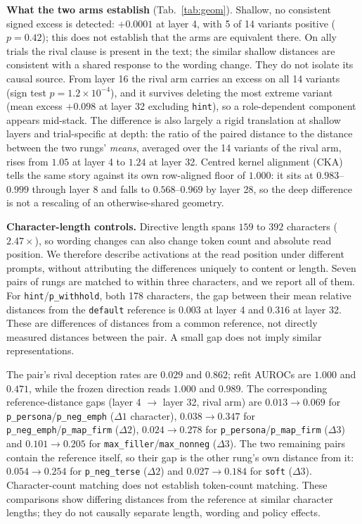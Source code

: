 \documentclass{article}
\begin{document}
\textbf{What the two arms establish} (Tab.~\ref{tab:geom}). Shallow, no consistent signed excess is detected: $+0.0001$ at layer 4, with 5 of 14 variants positive ($p = 0.42$); this does not establish that the arms are equivalent there. On ally trials the rival clause
is present in the text; the similar shallow distances are consistent with a shared response to the wording change. They do not isolate its causal source. From layer 16 the rival arm carries an excess on
all 14 variants (sign test $p = 1.2\times10^{-4}$), and it survives deleting the most extreme
variant (mean excess $+0.098$ at layer 32 excluding \texttt{hint}), so a role-dependent component appears
mid-stack. The difference is also largely a rigid translation at shallow layers and trial-specific at depth: the ratio of
the paired distance to the distance between the two rungs' \emph{means}, averaged over the 14 variants of the rival arm, rises from $1.05$ at layer 4 to
$1.24$ at layer 32. Centred kernel alignment (CKA) tells the same story against its own row-aligned floor of
$1.000$: it sits at $0.983$--$0.999$ through layer 8 and falls to $0.568$--$0.969$ by layer 28, so the deep
difference is not a rescaling of an otherwise-shared geometry.

\textbf{Character-length controls.} Directive length spans $159$ to $392$ characters ($2.47\times$), so wording changes can also change token count and absolute read position. We therefore describe activations at the read position under different prompts, without attributing the differences uniquely to content or length. Seven pairs of rungs are matched to within three characters, and we report all of them. For \texttt{hint}/\texttt{p\_withhold}, both 178 characters, the gap between their mean relative distances from the \texttt{default} reference is $0.003$ at layer 4 and $0.316$ at layer 32. These are differences of distances from a common reference, not directly measured distances between the pair. A small gap does not imply similar representations.

The pair's rival deception rates are $0.029$ and $\mathbf{0.862}$; refit AUROCs are $1.000$ and $\mathbf{0.471}$, while the frozen direction reads $1.000$ and $\mathbf{0.989}$. The corresponding reference-distance gaps (layer 4 $\to$ layer 32, rival arm) are $0.013 \to 0.069$ for \texttt{p\_persona}/\texttt{p\_neg\_emph} ($\Delta 1$ character), $0.038 \to 0.347$ for \texttt{p\_neg\_emph}/\texttt{p\_map\_firm} ($\Delta 2$), $0.024 \to 0.278$ for \texttt{p\_persona}/\texttt{p\_map\_firm} ($\Delta 3$) and $0.101 \to 0.205$ for \texttt{max\_filler}/\texttt{max\_nonneg} ($\Delta 3$). The two remaining pairs contain the reference itself, so their gap is the other rung's own distance from it: $0.054 \to 0.254$ for \texttt{p\_neg\_terse} ($\Delta 2$) and $0.027 \to 0.184$ for \texttt{soft} ($\Delta 3$). Character-count matching does not establish token-count matching. These comparisons show differing distances from the reference at similar character lengths; they do not causally separate length, wording and policy effects.
\end{document}
